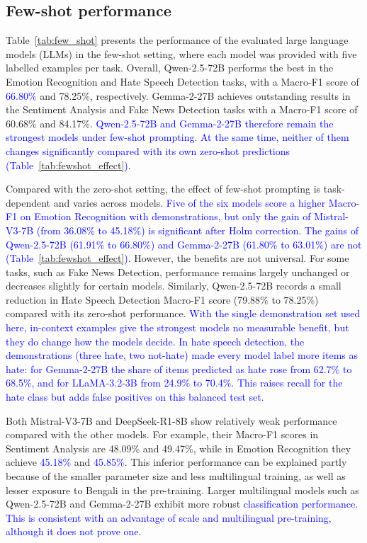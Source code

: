 \documentclass[10pt,letterpaper]{article}
\newcommand{\rev}[1]{\textcolor{blue}{#1}}
\begin{document}
\subsection*{Few-shot performance}
\label{sec:few_shot}


Table~\ref{tab:few_shot} presents the performance of the evaluated large language models (LLMs) in the few-shot setting, where each model was provided with five labelled examples per task. Overall, Qwen-2.5-72B performs the best in the Emotion Recognition and Hate Speech Detection tasks, with a Macro-F1 score of \rev{66.80\%} and 78.25\%, respectively. Gemma-2-27B achieves outstanding results in the Sentiment Analysis and Fake News Detection tasks with a Macro-F1 score of 60.68\% and 84.17\%. \rev{Qwen-2.5-72B and Gemma-2-27B therefore remain the strongest models under few-shot prompting. At the same time, neither of them changes significantly compared with its own zero-shot predictions (Table~\ref{tab:fewshot_effect}).}

Compared with the zero-shot setting, the effect of few-shot prompting is task-dependent and varies across models. \rev{Five of the six models score a higher Macro-F1 on Emotion Recognition with demonstrations, but only the gain of Mistral-V3-7B (from 36.08\% to 45.18\%) is significant after Holm correction. The gains of Qwen-2.5-72B (61.91\% to 66.80\%) and Gemma-2-27B (61.80\% to 63.01\%) are not (Table~\ref{tab:fewshot_effect}).} However, the benefits are not universal. For some tasks, such as Fake News Detection, performance remains largely unchanged or decreases slightly for certain models. Similarly, Qwen-2.5-72B records a small reduction in Hate Speech Detection Macro-F1 score (79.88\% to 78.25\%) compared with its zero-shot performance. \rev{With the single demonstration set used here, in-context examples give the strongest models no measurable benefit, but they do change how the models decide. In hate speech detection, the demonstrations (three hate, two not-hate) made every model label more items as hate: for Gemma-2-27B the share of items predicted as hate rose from 62.7\% to 68.5\%, and for LLaMA-3.2-3B from 24.9\% to 70.4\%. This raises recall for the hate class but adds false positives on this balanced test set.}

Both Mistral-V3-7B and DeepSeek-R1-8B show relatively weak performance compared with the other models. For example, their Macro-F1 scores in Sentiment Analysis are 48.09\% and 49.47\%, while in Emotion Recognition they achieve \rev{45.18\%} and \rev{45.85\%}. This inferior performance can be explained partly because of the smaller parameter size and less multilingual training, as well as lesser exposure to Bengali in the pre-training. Larger multilingual models such as Qwen-2.5-72B and Gemma-2-27B exhibit more robust \rev{classification performance. This is consistent with an advantage of scale and multilingual pre-training, although it does not prove one}.
\end{document}
